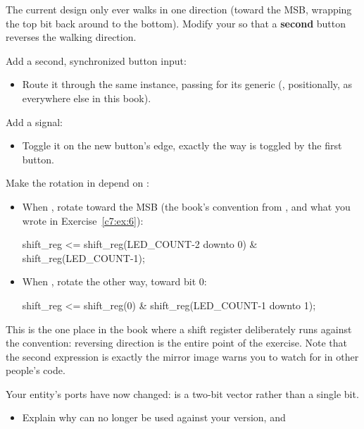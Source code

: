 \label{c7:ex:8}
The current design only ever walks in one direction (toward the MSB, wrapping the top bit back
around to the bottom). Modify your  so that a \textbf{second} button reverses
the walking direction.

\begin{parts}
  \item Add a second, synchronized button input:
    \begin{itemize}
      \item Route it through the same  instance, passing  for its
         generic (, positionally, as everywhere else in this
        book).
    \end{itemize}
  \item Add a  signal:
    \begin{itemize}
      \item Toggle it on the new button's edge, exactly the way  is toggled by
        the first button.
    \end{itemize}
  \item Make the rotation in  depend on :
    \begin{itemize}
      \item When , rotate toward the MSB (the book's convention from
        , and what you wrote in Exercise~\ref{c7:ex:6}):
\begin{vhdlcode}
shift_reg <= shift_reg(LED_COUNT-2 downto 0) & shift_reg(LED_COUNT-1);
\end{vhdlcode}
      \item When , rotate the other way, toward bit 0:
\begin{vhdlcode}
shift_reg <= shift_reg(0) & shift_reg(LED_COUNT-1 downto 1);
\end{vhdlcode}
    \end{itemize}
    This is the one place in the book where a shift register deliberately runs against the
    convention: reversing direction is the entire point of the exercise. Note that the
    second expression is exactly the mirror image  warns you to watch for in other
    people's code.
  \item Your entity's ports have now changed:  is a two-bit vector rather than a
    single bit.
    \begin{itemize}
      \item Explain why  can no longer be used against your version, and

\end{itemize}
\end{parts}
